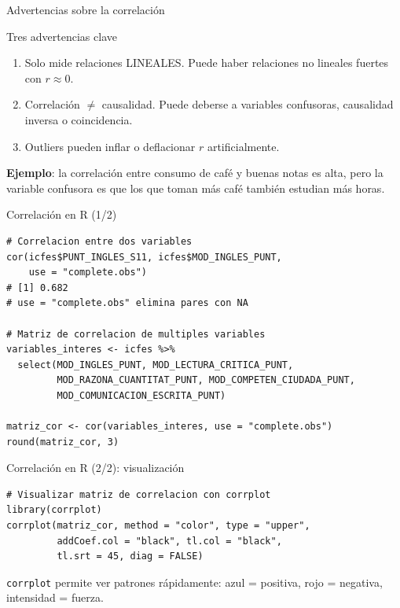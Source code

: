 \documentclass[aspectratio=169, 11pt]{beamer}
\begin{document}
\begin{frame}{Advertencias sobre la correlación}
\begin{alertblock}{Tres advertencias clave}
\begin{enumerate}
\item \alert{Solo mide relaciones LINEALES}. Puede haber relaciones no lineales fuertes con $r \approx 0$.
\item \alert{Correlación $\neq$ causalidad}. Puede deberse a variables confusoras, causalidad inversa o coincidencia.
\item \alert{Outliers} pueden inflar o deflacionar $r$ artificialmente.
\end{enumerate}
\end{alertblock}

\vspace{0.5em}
\textbf{Ejemplo}: la correlaci\'on entre consumo de caf\'e y buenas notas es alta, pero la variable confusora es que los que toman m\'as caf\'e tambi\'en estudian m\'as horas.
\end{frame}

\begin{frame}[fragile]{Correlación en R (1/2)}
\begin{lstlisting}
# Correlacion entre dos variables
cor(icfes$PUNT_INGLES_S11, icfes$MOD_INGLES_PUNT,
    use = "complete.obs")
# [1] 0.682
# use = "complete.obs" elimina pares con NA

# Matriz de correlacion de multiples variables
variables_interes <- icfes %>%
  select(MOD_INGLES_PUNT, MOD_LECTURA_CRITICA_PUNT,
         MOD_RAZONA_CUANTITAT_PUNT, MOD_COMPETEN_CIUDADA_PUNT,
         MOD_COMUNICACION_ESCRITA_PUNT)

matriz_cor <- cor(variables_interes, use = "complete.obs")
round(matriz_cor, 3)
\end{lstlisting}
\end{frame}

\begin{frame}[fragile]{Correlación en R (2/2): visualización}
\begin{lstlisting}
# Visualizar matriz de correlacion con corrplot
library(corrplot)
corrplot(matriz_cor, method = "color", type = "upper",
         addCoef.col = "black", tl.col = "black",
         tl.srt = 45, diag = FALSE)
\end{lstlisting}

\texttt{corrplot} permite ver patrones rápidamente: azul = positiva, rojo = negativa, intensidad = fuerza.
\end{frame}
\end{document}
